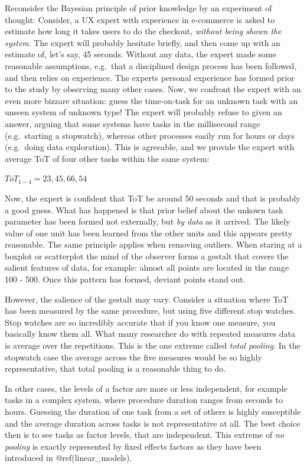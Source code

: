 \documentclass[]{svmono}
\theoremstyle{definition}
\theoremstyle{definition}
\theoremstyle{definition}
\theoremstyle{remark}
\begin{document}
Reconsider the Bayesian principle of prior knowledge by an experiment of
thought: Consider, a UX expert with experience in e-commerce is asked to
estimate how long it takes users to do the checkout, \emph{without being
shown the system}. The expert will probably hesitate briefly, and then
come up with an estimate of, let's say, 45 seconds. Without any data,
the expert made some reasonable assumptions, e.g.~that a disciplined
design process has been followed, and then relies on experience. The
experts personal experience has formed prior to the study by observing
many other cases. Now, we confront the expert with an even more bizzare
situation: guess the time-on-task for an unknown task with an unseen
system of unknown type! The expert will probably refuse to given an
answer, arguing that some systems have tasks in the millisecond range
(e.g.~starting a stopwatch), whereas other processes easily run for
hours or days (e.g.~doing data exploration). This is agreeable, and we
provide the expert with average ToT of four other tasks within the same
system:

\(ToT_{1-4} = {23, 45, 66, 54}\)

Now, the expert is confident that ToT be around 50 seconds and that is
probably a good guess. What has happened is that prior belief about the
unkown task parameter has been formed not externally, but \emph{by data}
as it arrived. The likely value of one unit has been learned from the
other units and this appears pretty reasonable. The same principle
applies when removing outliers. When staring at a boxplot or scatterplot
the mind of the observer forms a gestalt that covers the salient
features of data, for example: almost all points are located in the
range 100 - 500. Once this pattern has formed, deviant points stand out.

However, the salience of the gestalt may vary. Consider a situation
where ToT has been measured by the same procedure, but using five
different stop watches. Stop watches are so incredibly accurate that if
you know one measure, you basically know them all. What many researcher
do with repeated measures data is average over the repetitions. This is
the one extreme called \emph{total pooling}. In the stopwatch case the
average across the five measures would be so highly representative, that
total pooling is a reasonable thing to do.

In other cases, the levels of a factor are more or less independent, for
example tasks in a complex system, where procedure duration ranges from
seconds to hours. Guessing the duration of one task from a set of others
is highly susceptible and the average duration across tasks is not
representative at all. The best choice then is to see tasks as factor
levels, that are independent. This extreme of \emph{no pooling} is
exactly represented by fixed effects factors as they have been
introduced in @ref(linear\_models).
\end{document}
